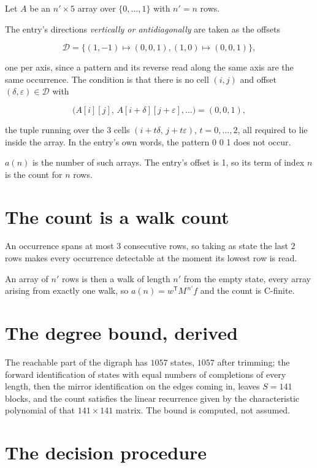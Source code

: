 \documentclass[11pt]{article}
\theoremstyle{definition}
\begin{document}
Let $A$ be an $n' \times 5$ array over $\{0,\dots,1\}$ with $n' = n$ rows.

The entry's directions {\itshape vertically or antidiagonally} are taken as the offsets

\[\mathcal{D} = \{(1,-1)\mapsto(0,0,1), (1,0)\mapsto(0,0,1)\},\]

one per axis, since a pattern and its reverse read along the same axis are the same occurrence. The condition is that there is no cell $(i,j)$ and offset $(\delta,\varepsilon)\in\mathcal{D}$ with

\[\bigl(A[i][j],\,A[i{+}\delta][j{+}\varepsilon],\dots\bigr) = (0, 0, 1),\]

the tuple running over the $3$ cells $(i+t\delta,\,j+t\varepsilon)$, $t = 0,\dots,2$, all required to lie inside the array. In the entry's own words, the pattern 0 0 1 does not occur.

$a(n)$ is the number of such arrays. The entry's offset is 1, so its term of index $n$ is the count for $n$ rows.

\section{The count is a walk count}

An occurrence spans at most $3$ consecutive rows, so taking as state the last $2$ rows makes every occurrence detectable at the moment its lowest row is read.

An array of $n'$ rows is then a walk of length $n'$ from the empty state, every array arising from exactly one walk, so $a(n) = w^{\mathsf T}M^{\,n'}f$ and the count is C-finite.

\section{The degree bound, derived}

The reachable part of the digraph has $1057$ states, $1057$ after trimming; the forward identification of states with equal numbers of completions of every length, then the mirror identification on the edges coming in, leaves $S = 141$ blocks, and the count satisfies the linear recurrence given by the characteristic polynomial of that $141\times141$ matrix. The bound is computed, not assumed.

\section{The decision procedure}
\end{document}
